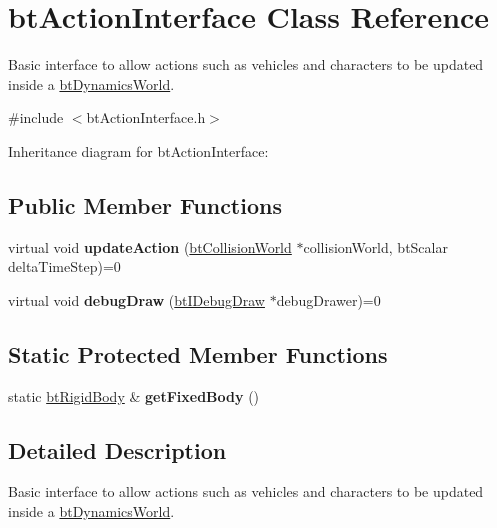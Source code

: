 \hypertarget{classbt_action_interface}{\section{bt\+Action\+Interface Class Reference}
\label{classbt_action_interface}
}


Basic interface to allow actions such as vehicles and characters to be updated inside a \hyperlink{classbt_dynamics_world}{bt\+Dynamics\+World}.  




{\ttfamily \#include $<$bt\+Action\+Interface.\+h$>$}



Inheritance diagram for bt\+Action\+Interface\+:
\subsection*{Public Member Functions}
\begin{DoxyCompactItemize}
\item 
\hypertarget{classbt_action_interface_af4ab1d50c7c4997edd510a0b31e55b42}{virtual void {\bfseries update\+Action} (\hyperlink{classbt_collision_world}{bt\+Collision\+World} $\ast$collision\+World, bt\+Scalar delta\+Time\+Step)=0}\label{classbt_action_interface_af4ab1d50c7c4997edd510a0b31e55b42}

\item 
\hypertarget{classbt_action_interface_a8e4276e041d520cffc836dfd311749ec}{virtual void {\bfseries debug\+Draw} (\hyperlink{classbt_i_debug_draw}{bt\+I\+Debug\+Draw} $\ast$debug\+Drawer)=0}\label{classbt_action_interface_a8e4276e041d520cffc836dfd311749ec}

\end{DoxyCompactItemize}
\subsection*{Static Protected Member Functions}
\begin{DoxyCompactItemize}
\item 
\hypertarget{classbt_action_interface_a4a1b027efbb978fa346eaa5bdc0877a7}{static \hyperlink{classbt_rigid_body}{bt\+Rigid\+Body} \& {\bfseries get\+Fixed\+Body} ()}\label{classbt_action_interface_a4a1b027efbb978fa346eaa5bdc0877a7}

\end{DoxyCompactItemize}


\subsection{Detailed Description}
Basic interface to allow actions such as vehicles and characters to be updated inside a \hyperlink{classbt_dynamics_world}{bt\+Dynamics\+World}. 

